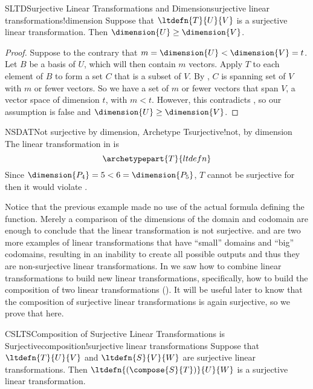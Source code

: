 %
%
\begin{theorem}{SLTD}{Surjective Linear Transformations and Dimension}{surjective linear transformations!dimension}
Suppose that $\ltdefn{T}{U}{V}$ is a surjective linear transformation.  Then $\dimension{U}\geq\dimension{V}$.
\end{theorem}
%
\begin{proof}
%
Suppose to the contrary that $m=\dimension{U}<\dimension{V}=t$.  Let $B$ be  a basis of $U$, which will then contain $m$ vectors.  Apply $T$ to each element of $B$ to form a set $C$ that is a subset of $V$.  By , $C$ is spanning set of $V$ with $m$ or fewer vectors.  So we have a set of $m$ or fewer vectors that span $V$, a vector space of dimension $t$, with $m<t$.  However, this contradicts , so our assumption is false and $\dimension{U}\geq\dimension{V}$.
%
\end{proof}
%
%
\begin{example}{NSDAT}{Not surjective by dimension, Archetype T}{surjective!not, by dimension}
The linear transformation in  is
%
\begin{equation*}
\archetypepart{T}{ltdefn}
\end{equation*}
%
Since $\dimension{P_4}=5<6=\dimension{P_5}$, $T$ cannot be surjective for then it would violate .
%
\end{example}
%
Notice that the previous example made no use of the actual formula defining the function.  Merely a comparison of the dimensions of the domain and codomain are enough to conclude that the linear transformation is not surjective.   and  are two more examples of linear transformations that have ``small'' domains and ``big'' codomains, resulting in an inability to create all possible outputs and thus they are non-surjective linear transformations.
%
%
In  we saw how to combine linear transformations to build new linear transformations, specifically, how to build the composition of two linear transformations ().  It will be useful later to know that the composition of surjective linear transformations is again surjective, so we prove that here.
%
\begin{theorem}{CSLTS}{Composition of Surjective Linear Transformations is Surjective}{composition!surjective linear transformations}
Suppose that $\ltdefn{T}{U}{V}$ and $\ltdefn{S}{V}{W}$ are surjective linear transformations.  Then $\ltdefn{(\compose{S}{T})}{U}{W}$ is a surjective linear transformation.
\end{theorem}
